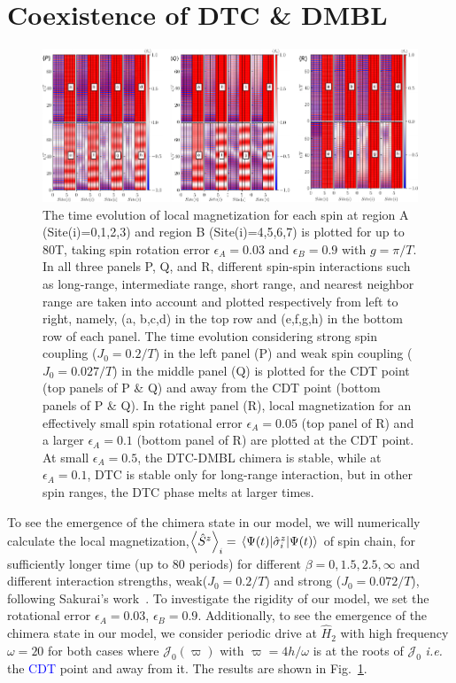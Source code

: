 \documentclass[%
reprint,
superscriptaddress,
amsmath,amssymb,showkeys,
aps,
prb,
]{revtex4-2}
\newcommand{\blue}[1]{\textcolor{blue}{#1}}
\begin{document}
	
	\section{\label{sec:level3}Coexistence of DTC \& DMBL}
	
	\begin{figure}[t!]
		\centering
		\includegraphics[width=17.5cm]{sz_t_strongweakJ_ea_N_8.pdf}
		\caption{The time evolution of local magnetization for each spin at region A (Site(i)=0,1,2,3) and region B (Site(i)=4,5,6,7) is plotted for up to 80T, taking spin rotation error $\epsilon_A = 0.03$ and $\epsilon_B = 0.9$ with $g=\pi/T$.  In all three panels P, Q, and R, different spin-spin interactions such as long-range, intermediate range, short range, and nearest neighbor range are taken into account and plotted respectively from left to right, namely, (a, b,c,d) in the top row and (e,f,g,h) in the bottom row of each panel. The time evolution considering strong spin coupling ($J_0 = 0.2/T$) in the left panel (P) and weak spin coupling ($J_0 = 0.027/T$) in the middle panel (Q) is plotted  for the CDT point (top panels of P \& Q) and away from the CDT point (bottom panels of P \& Q). In the right panel (R), local magnetization for an effectively small spin rotational error $\epsilon_A = 0.05$ (top panel of R) and a larger $\epsilon_A = 0.1$ (bottom panel of R) are plotted at the CDT point. At small $\epsilon_A=0.5$, the DTC-DMBL chimera is stable, while at $\epsilon_A=0.1$, DTC is stable only for long-range interaction, but in other spin ranges, the DTC phase melts at larger times.}
		\label{Fig:strong_weak_ea}
	\end{figure}
	
	To see the emergence of the chimera state in our model, we will numerically calculate the local magnetization,$\left\langle{\hat{S}^z}\right\rangle_i = \expval{\hat{\sigma}^z_i}{\Psi(t)}$ of spin chain, for sufficiently longer time (up to 80 periods) for different $\beta = 0,1.5,2.5,\infty$ and different interaction strengths, weak($J_0 = 0.2/T$) and strong ($J_0 = 0.072/T$), following Sakurai's work~\cite{sakurai_phys_nodate}. To investigate the rigidity of our model, we set the rotational error $\epsilon_A = 0.03$, $\epsilon_B = 0.9$. Additionally, to see the emergence of the chimera state in our model, we consider periodic drive at $\hat{H}_2$ with high frequency $\omega=20$ for both cases where $\mathcal{J}_0(\varpi)$ with $\varpi = 4h/\omega$ is at the roots of $\mathcal{J}_0$ \textit{i.e.} the \blue{CDT} point and away from it. The results are shown in Fig.~\ref{Fig:strong_weak_ea}. 
		 
\end{document}

